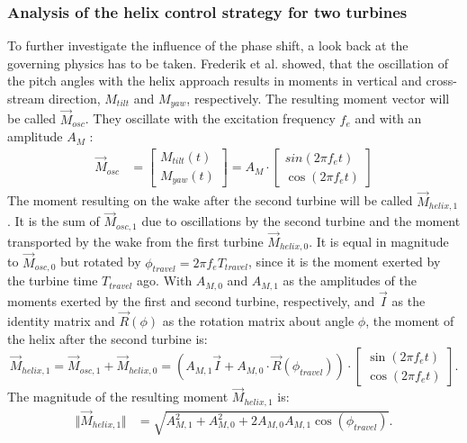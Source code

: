 \subsubsection{Analysis of the helix control strategy for two turbines}
To further investigate the influence of the phase shift, a look back at the governing physics has to be taken. Frederik et al. \cite{frederik_helix_2020} showed, that the oscillation of the pitch angles with the helix approach results in moments in vertical and cross-stream direction, $M_{tilt}$ and $M_{yaw}$, respectively. The resulting moment vector will be called $\vec{M}_{osc}$. They oscillate with the excitation frequency $f_e$ and with an amplitude $A_M$ :
\begin{align}
\vec{M}_{osc} &=
\begin{bmatrix}
M_{tilt}(t) \\
M_{yaw}(t)
\end{bmatrix} = 
A_M \cdot
\begin{bmatrix}
sin(2\pi f_e t) \\
\cos(2\pi f_e t)
\end{bmatrix}
\end{align}
The moment resulting on the wake after the second turbine will be called $\vec{M}_{helix,1}$. It is the sum of $\vec{M}_{osc,1}$ due to oscillations by the second turbine and the moment transported by the wake from the first turbine $\vec{M}_{helix,0}$. It is equal in magnitude to $\vec{M}_{osc,0}$ but rotated by $\phi_{travel}=2 \pi f_e T_{travel}$, since it is the moment exerted by the turbine time $T_{travel}$ ago. With $A_{M,0}$ and $A_{M,1}$ as the amplitudes of the moments exerted by the first and second turbine, respectively, and $\vec{I}$ as the identity matrix and $\vec{R}(\phi)$ as the rotation matrix about angle $\phi$, the moment of the helix after the second turbine is:
\begin{equation}
	\vec{M}_{helix,1} = \vec{M}_{osc,1} + \vec{M}_{helix,0} = \left(A_{M,1} \vec{I} + A_{M,0} \cdot \vec{R}(\phi_{travel})\right) 
	\cdot 
	\begin{bmatrix}
	\sin(2\pi f_e t) \\
	\cos(2\pi f_e t)
	\end{bmatrix} .
\end{equation}
The magnitude of the resulting moment $\vec{M}_{helix,1}$ is:
\begin{align}
	\Vert\vec{M}_{helix,1}\Vert &= \sqrt{A_{M,1}^2 + A_{M,0}^2 + 2 A_{M,0} A_{M,1} \cos(\phi_{travel})}  \label{eq:helix_moment}.
\end{align}
